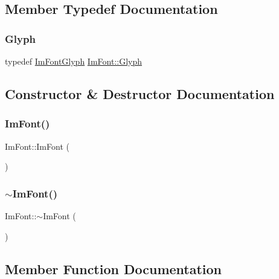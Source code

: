 \subsection{Member Typedef Documentation}
\mbox{\label{struct_im_font_a4b802233ac8d3f3beddc395837288683}} 
\subsubsection{\texorpdfstring{Glyph}{Glyph}}
{\footnotesize\ttfamily typedef \mbox{\hyperlink{struct_im_font_glyph}{Im\+Font\+Glyph}} \mbox{\hyperlink{struct_im_font_a4b802233ac8d3f3beddc395837288683}{Im\+Font\+::\+Glyph}}}



\subsection{Constructor \& Destructor Documentation}
\mbox{\label{struct_im_font_a1d35b1eb7c2f6a3a648308531e88e7f1}} 
\subsubsection{\texorpdfstring{Im\+Font()}{ImFont()}}
{\footnotesize\ttfamily Im\+Font\+::\+Im\+Font (\begin{DoxyParamCaption}{ }\end{DoxyParamCaption})}

\mbox{\label{struct_im_font_a377366ed7c5d076363ad4760aeff63ec}} 
\subsubsection{\texorpdfstring{$\sim$\+Im\+Font()}{~ImFont()}}
{\footnotesize\ttfamily Im\+Font\+::$\sim$\+Im\+Font (\begin{DoxyParamCaption}{ }\end{DoxyParamCaption})}



\subsection{Member Function Documentation}
\mbox{\label{struct_im_font_ae63d3d343052336d7718aacac8f394b7}} 
